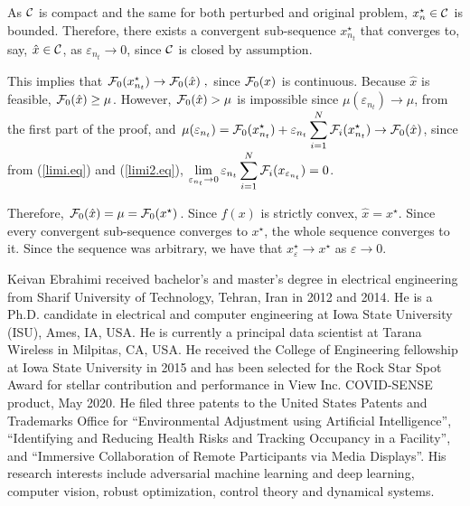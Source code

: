 \documentclass[journal,twoside,web]{ieeecolor}
\begin{document}
As ${\cal C}$ is compact and the same for both perturbed and original problem, $x^\star_{n}\in {\cal C}$ is bounded.  Therefore, there exists a convergent sub-sequence $x_{n_t}^\star$ that converges to, say, $\hat{x}\in {\cal C}$, as $\varepsilon_{n_t} \to 0$, since ${\cal C}$ is closed by assumption.

This implies that
${\cal F}_0(x_{n_t}^\star) \to {\cal F}_0(\hat{x})\;,$ since ${\cal F}_0(x)$ is continuous.
Because $\hat{x}$ is feasible, ${\cal F}_0(\hat{x})\geq \mu$.
However,  ${\cal F}_0(\hat{x})>\mu$ is impossible since
$
\mu(\varepsilon_{n_t})\to \mu
$,
from the first part of the proof, and $\displaystyle\mu(\varepsilon_{n_t})={\cal F}_0(x^\star_{n_t})+\varepsilon_{n_t}\sum_{i=1}^N{\cal F}_{i}(x_{n_t}^\star)\to {\cal F}_0(\hat{x})$, since from (\ref{limi.eq}) and (\ref{limi2.eq}), $\displaystyle\lim_{\varepsilon_{n_t}\to 0}
\varepsilon_{n_t}\sum_{i=1}^N{\cal F}_{i}(x_{\varepsilon_{n_t}})=0$\;.

Therefore, ${\cal F}_0(\hat{x})=\mu={\cal F}_0(x^\star)$. Since $f(x)$ is strictly convex, $\hat{x}=x^\star$. Since every convergent sub-sequence converges to $x^\star$, the whole sequence converges to it. Since the sequence was arbitrary, we have that $x^\star_\varepsilon\to x^\star$ as $\varepsilon\to 0$\;.



\begin{IEEEbiography}
{Keivan Ebrahimi} received bachelor's and master's degree in electrical engineering from Sharif University of Technology, Tehran, Iran in 2012 and 2014. He is a Ph.D. candidate in electrical and computer engineering at Iowa State University (ISU), Ames, IA, USA. He is currently a principal data scientist at Tarana Wireless in Milpitas, CA, USA. He received the College of Engineering fellowship at Iowa State University in 2015 and has been selected for the Rock Star Spot Award for stellar contribution and performance in View Inc. COVID-SENSE product, May 2020. He filed three patents to the United States Patents and Trademarks Office for “Environmental Adjustment using Artificial Intelligence”, “Identifying and Reducing Health Risks and Tracking Occupancy in a Facility”, and “Immersive Collaboration of Remote Participants via Media Displays”. His research interests include adversarial machine learning and deep learning, computer vision, robust optimization, control theory and dynamical systems.
\end{IEEEbiography}
\end{document}

